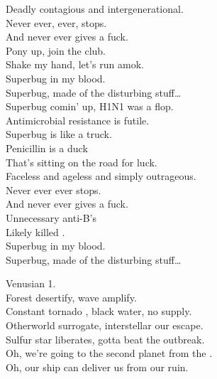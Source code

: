 Deadly contagious and intergenerational. \\
Never ever, ever, stops. \\
And never ever gives a fuck. \\

Pony up, join the club. \\
Shake my hand, let's run amok. \\

Superbug in my blood. \\
Superbug, made of the disturbing stuff… \\

Superbug comin' up, H1N1 was a flop. \\
Antimicrobial resistance is futile. \\
Superbug is like a truck. \\
Penicillin is a duck \\
That's sitting on the road for luck. \\

Faceless and ageless and simply outrageous. \\
Never ever ever stops. \\
And never ever gives a fuck. \\

Unnecessary anti-B's \\
Likely killed . \\

Superbug in my blood. \\
Superbug, made of the disturbing stuff… \\





Venusian 1. \\

Forest desertify,  wave amplify. \\
Constant tornado , black water, no supply. \\
Otherworld surrogate, interstellar our escape. \\
Sulfur star liberates, gotta beat the outbreak. \\

Oh, we're going to the second planet from the . \\
Oh, our ship can deliver us from our ruin. \\

